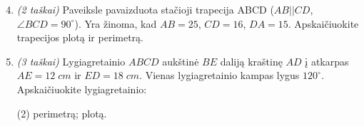 \documentclass[a4paper]{article}
\begin{document}
\begin{minipage}{0.5\textwidth}
      \begin{enumerate}
            \setcounter{enumi}{3} %
            \item \textit{(2 taškai)} Paveiksle pavaizduota stačioji trapecija
                  ABCD
                  ($AB||CD$, $\angle BCD = 90^{\circ}$). Yra žinoma, kad $AB =
                        25$,
                  $CD = 16$,
                  $DA = 15$. Apskaičiuokite trapecijos plotą ir perimetrą.

      \end{enumerate}
\end{minipage}

\begin{enumerate}
      \setcounter{enumi}{4} %
      \item \textit{(3 taškai)} Lygiagretainio $ABCD$ aukštinė $BE$ daliją
            kraštinę $AD$ į atkarpas $AE = 12\;cm$ ir $ED = 18\;cm$. Vienas
            lygiagretainio kampas lygus $120^\circ$. Apskaičiuokite
            lygiagretainio:

            \begin{tasks}[item-format={\normalfont}, after-item-skip=2mm](2)
                  \task perimetrą;
                  \task plotą.
            \end{tasks}
\end{enumerate}
\end{document}
